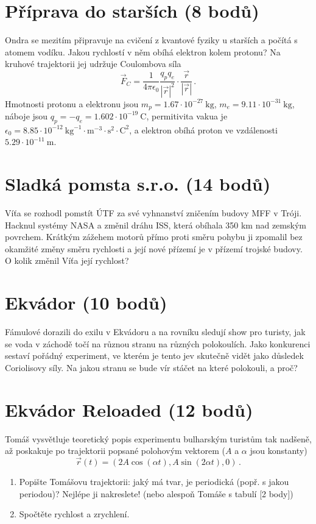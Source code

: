 \documentclass[10pt,a4paper,landscape]{article}
\begin{document}
\begin{multicols}{2}[]
\section{Příprava do starších (8 bodů)}
Ondra se mezitím připravuje na cvičení z kvantové fyziky u starších a počítá s atomem vodíku. Jakou rychlostí v něm obíhá elektron kolem protonu? Na kruhové trajektorii jej udržuje Coulombova síla
\begin{equation}
\vec{F}_C = \frac{1}{4\pi\epsilon_0}\frac{q_p q_e}{\left|\vec{r}\right|^2}\cdot\frac{\vec{r}}{\left|\vec{r}\right|} \,.
\end{equation}
Hmotnosti protonu a elektronu jsou $m_p = 1.67\cdot 10^{-27}~\mathrm{kg}$, $m_e = 9.11\cdot 10^{-31}~\mathrm{kg}$, náboje jsou $q_p = -q_e = 1.602\cdot 10^{-19}~\mathrm{C}$, permitivita vakua je $\epsilon_0 = 8.85\cdot 10^{-12}~\mathrm{kg}^{-1}\cdot\mathrm{m}^{-3}\cdot\mathrm{s}^{2}\cdot\mathrm{C}^{2}$, a elektron obíhá proton ve vzdálenosti $5.29\cdot 10^{-11}~\mathrm{m}$.

\section{Sladká pomsta s.r.o. (14 bodů)}
Víťa se rozhodl pomstít ÚTF za své vyhnanství zničením budovy MFF v Tróji. Hacknul systémy NASA a změnil dráhu ISS, která obíhala 350 km nad zemským povrchem. Krátkým zážehem motorů přímo proti směru pohybu ji zpomalil bez okamžité změny směru rychlosti a její nové přízemí je v přízemí trojské budovy. O kolik změnil Víťa její rychlost?

\section{Ekvádor (10 bodů)}
Fámulové dorazili do exilu v Ekvádoru a na rovníku sledují show pro turisty, jak se voda v záchodě točí na různou stranu na různých polokoulích. Jako konkurenci sestaví pořádný experiment, ve kterém je tento jev skutečně vidět jako důsledek Coriolisovy síly. Na jakou stranu se bude vír stáčet na které polokouli, a proč?

\section{Ekvádor Reloaded (12 bodů)}
Tomáš vysvětluje teoretický popis experimentu bulharským turistům tak nadšeně, až poskakuje po trajektorii popsané polohovým vektorem ($A$ a $\alpha$ jsou konstanty)
\begin{equation}
\vec{r}\left(t\right) = \left(2A\cos\left(\alpha t\right), A\sin\left(2\alpha t\right), 0\right) \,.
\end{equation}
\begin{enumerate}
\item Popište Tomášovu trajektorii: jaký má tvar, je periodická (popř. s jakou periodou)? Nejlépe ji nakreslete! (nebo alespoň Tomáše s tabulí [2 body])
\item Spočtěte rychlost a zrychlení.
\end{enumerate}


\end{multicols}
\end{document}
